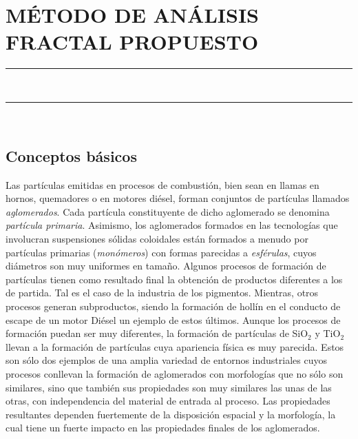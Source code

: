 \pagestyle{plain}
\chapter{MÉTODO DE ANÁLISIS FRACTAL PROPUESTO}\label{cap:MetodosAnalisisFractal}
\vspace{0.2cm}
\rule{\linewidth}{1.5pt}\\
\startcontents[chapters]
\vspace{0.2cm}
\rule{\linewidth}{1.5pt}\\
\newpage
\section{Conceptos básicos}\label{sec:ConceptosBasicos}
\par Las partículas emitidas en procesos de combustión, bien sean en llamas en hornos, quemadores o en motores diésel, forman conjuntos de partículas llamados  \emph{aglomerados}. Cada partícula constituyente de dicho aglomerado se denomina  \emph{partícula primaria}. Asimismo, los aglomerados formados en las tecnologías que involucran suspensiones sólidas coloidales están formados a menudo por partículas primarias (\emph{monómeros}) con formas parecidas a  \emph{esférulas}, cuyos diámetros son muy uniformes en tamaño. Algunos procesos de formación de partículas tienen como resultado final la obtención de productos diferentes a los de partida. Tal es el caso de la industria de los pigmentos. Mientras, otros procesos generan subproductos, siendo la formación de hollín en el conducto de escape de un motor Diésel un ejemplo de estos últimos. Aunque los procesos de formación puedan ser muy diferentes, la formación de partículas de SiO$_2$ y TiO$_2$ llevan a la formación de partículas cuya apariencia física es muy parecida. Estos son sólo dos ejemplos de una amplia variedad de entornos industriales cuyos procesos conllevan la formación de aglomerados con morfologías que no sólo son similares, sino que también sus propiedades son muy similares las unas de las otras, con independencia del material de entrada al proceso. Las propiedades resultantes dependen fuertemente de la disposición espacial y la morfología, la cual tiene un fuerte impacto en las propiedades finales de los aglomerados.

